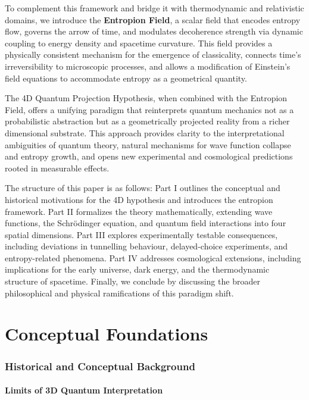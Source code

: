 \documentclass[12pt]{article}
\begin{document}
To complement this framework and bridge it with thermodynamic and relativistic domains, we introduce the \textbf{Entropion Field}, a scalar field that encodes entropy flow, governs the arrow of time, and modulates decoherence strength via dynamic coupling to energy density and spacetime curvature. This field provides a physically consistent mechanism for the emergence of classicality, connects time's irreversibility to microscopic processes, and allows a modification of Einstein's field equations to accommodate entropy as a geometrical quantity.

The 4D Quantum Projection Hypothesis, when combined with the Entropion Field, offers a unifying paradigm that reinterprets quantum mechanics not as a probabilistic abstraction but as a geometrically projected reality from a richer dimensional substrate. This approach provides clarity to the interpretational ambiguities of quantum theory, natural mechanisms for wave function collapse and entropy growth, and opens new experimental and cosmological predictions rooted in measurable effects.

The structure of this paper is as follows: Part I outlines the conceptual and historical motivations for the 4D hypothesis and introduces the entropion framework. Part II formalizes the theory mathematically, extending wave functions, the Schrödinger equation, and quantum field interactions into four spatial dimensions. Part III explores experimentally testable consequences, including deviations in tunnelling behaviour, delayed-choice experiments, and entropy-related phenomena. Part IV addresses cosmological extensions, including implications for the early universe, dark energy, and the thermodynamic structure of spacetime. Finally, we conclude by discussing the broader philosophical and physical ramifications of this paradigm shift.




\part{Conceptual Foundations}

\section{Historical and Conceptual Background}
\subsection{Limits of 3D Quantum Interpretation}
\end{document}
